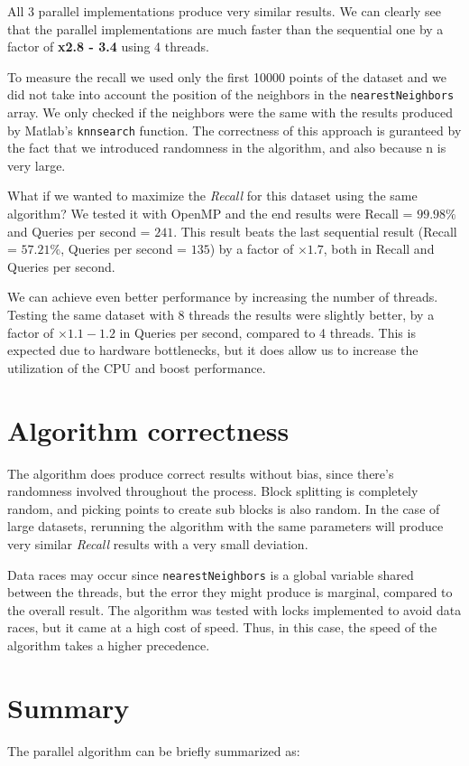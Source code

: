 \documentclass{article}
\begin{document}
All 3 parallel implementations produce very similar results. 
We can clearly see that the parallel implementations are much faster than the sequential one
by a factor of \textbf{x2.8 - 3.4} using 4 threads.

To measure the recall we used only the first 10000 points of the dataset and we did not take into account
the position of the neighbors in the \texttt{nearestNeighbors} array. We only checked if the neighbors were the same
with the results produced by Matlab's \texttt{knnsearch} function. The correctness of this approach is guranteed
by the fact that we introduced randomness in the algorithm, and also because n is very large.

What if we wanted to maximize the \emph{Recall} for this dataset using the same algorithm?
We tested it with OpenMP and the end results were Recall = $99.98\%$ and Queries per second = $241$.
This result beats the last sequential result (Recall = $57.21\%$, Queries per second = $135$) by a factor of $\times1.7$, 
both in Recall and Queries per second.

We can achieve even better performance by increasing the number of threads. Testing the same dataset with 8 threads the
results were slightly better, by a factor of $\times1.1-1.2$ in Queries per second, compared to 4 threads. This is expected due to hardware
bottlenecks, but it does allow us to increase the utilization of the CPU and boost performance.

\section{Algorithm correctness}
The algorithm does produce correct results without bias, since there's randomness involved throughout the process.
Block splitting is completely random, and picking points to create sub blocks is also random. In the case of large datasets, rerunning the
algorithm with the same parameters will produce very similar \emph{Recall} results with a very small deviation.

Data races may occur since \texttt{nearestNeighbors} is a global variable shared between the threads, but the error they might produce 
is marginal, compared to the overall result. The algorithm was tested with locks implemented to avoid data races, but it came at 
a high cost of speed. Thus, in this case, the speed of the algorithm takes a higher precedence.

\section{Summary}
The parallel algorithm can be briefly summarized as:
\end{document}
